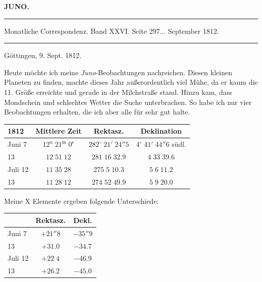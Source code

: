 \clearpage{}\hypertarget{native-365-lower}{}\label{native-365-lower}
\begin{center}\textbf{JUNO.}\par\vspace{4pt}\hrule\vspace{4pt}\fontsize{10}{12}\selectfont Monatliche Correspondenz. Band XXVI. Seite 297\;... September 1812.\par\vspace{4pt}\hrule\vspace{4pt}\end{center}

\begin{flushright}Göttingen, 9. Sept. 1812.\end{flushright}
\par\indent Heute möchte ich meine \emph{Juno}-Beobachtungen nachreichen. Diesen kleinen Planeten zu finden, machte dieses Jahr außerordentlich viel Mühe, da er kaum die 11. Größe erreichte und gerade in der Milchstraße stand. Hinzu kam, dass Mondschein und schlechtes Wetter die Suche unterbrachen. So habe ich nur vier Beobachtungen erhalten, die ich aber alle für sehr gut halte.

\begin{center}\fontsize{10}{12}\selectfont\setlength{\tabcolsep}{4pt}\renewcommand{\arraystretch}{1.15}\begin{tabular}{l|c|c|c}
1812 & Mittlere Zeit & Rektasz. & Deklination\\\hline
Juni 7 & $12^{\mathrm u}\;21^{\mathrm m}\;0^{\mathrm s}$ & $282^\circ\;21'\;24''5$ & $4^\circ\;41'\;44''6$ südl.\\
13 & $12\;51\;12$ & $281\;16\;32.9$ & $4\;33\;39.6$\\
Juli 12 & $11\;35\;28$ & $275\;5\;10.3$ & $5\;6\;11.2$\\
13 & $11\;28\;12$ & $274\;52\;49.9$ & $5\;9\;20.0$\\
\end{tabular}\end{center}

\par\indent Meine X Elemente ergeben folgende Unterschiede:

\begin{center}\fontsize{10}{12}\selectfont\setlength{\tabcolsep}{7pt}\renewcommand{\arraystretch}{1.15}\begin{tabular}{l|c|c}
& Rektasz. & Dekl.\\\hline
Juni 7 & $+21''8$ & $-35''9$\\
13 & $+31.0$ & $-34.7$\\
Juli 12 & $+22\;4$ & $-46.9$\\
13 & $+26.2$ & $-45.0$\\
\end{tabular}\end{center}

